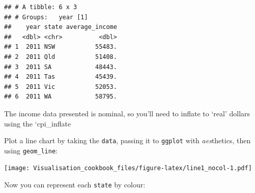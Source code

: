 \documentclass[]{book}
\newenvironment{Shaded}{\begin{snugshade}}{\end{snugshade}}
\newcommand{\DataTypeTok}[1]{\textcolor[rgb]{0.13,0.29,0.53}{#1}}
\newcommand{\KeywordTok}[1]{\textcolor[rgb]{0.13,0.29,0.53}{\textbf{#1}}}
\newcommand{\NormalTok}[1]{#1}
\newcommand{\OperatorTok}[1]{\textcolor[rgb]{0.81,0.36,0.00}{\textbf{#1}}}
\newcommand{\StringTok}[1]{\textcolor[rgb]{0.31,0.60,0.02}{#1}}
\begin{document}
\begin{Shaded}
\end{Shaded}

\begin{verbatim}
## # A tibble: 6 x 3
## # Groups:   year [1]
##    year state average_income
##   <dbl> <chr>          <dbl>
## 1  2011 NSW           55483.
## 2  2011 Qld           51408.
## 3  2011 SA            48443.
## 4  2011 Tas           45439.
## 5  2011 Vic           52053.
## 6  2011 WA            58795.
\end{verbatim}

The income data presented is nominal, so you'll need to inflate to `real' dollars using the `cpi\_inflate

Plot a line chart by taking the \texttt{data}, passing it to \texttt{ggplot} with \emph{aes}thetics, then using \texttt{geom\_line}:

\begin{Shaded}
\end{Shaded}

\texttt{[image: Visualisation\_cookbook\_files/figure-latex/line1\_nocol-1.pdf]}

Now you can represent each \texttt{state} by colour:

\begin{Shaded}
\end{Shaded}
\end{document}
